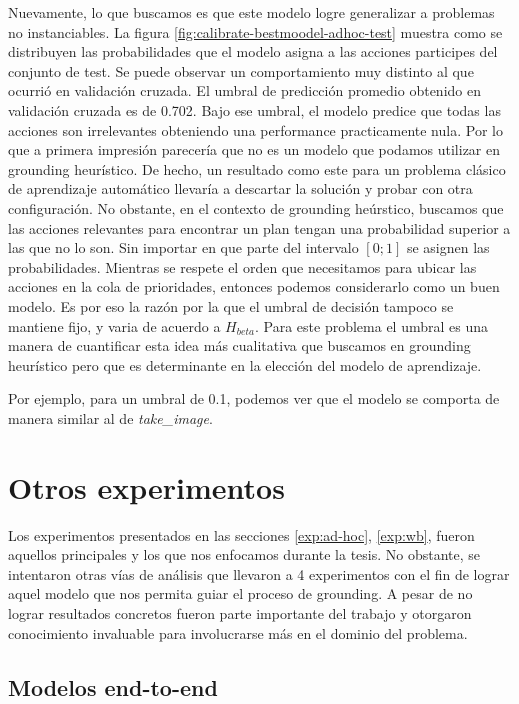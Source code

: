 Nuevamente, lo que buscamos es que este modelo logre generalizar a problemas no
instanciables. La figura \ref{fig:calibrate-bestmoodel-adhoc-test} muestra como
se distribuyen las probabilidades que el modelo asigna a las acciones participes
del conjunto de test. Se puede observar un comportamiento muy distinto al que
ocurrió en validación cruzada. El umbral de predicción promedio obtenido en
validación cruzada es de 0.702. Bajo ese umbral, el modelo predice que todas las
acciones son irrelevantes obteniendo una performance practicamente nula. Por lo
que a primera impresión parecería que no es un modelo que podamos utilizar en
grounding heurístico. De hecho, un resultado como este para un problema clásico
de aprendizaje automático llevaría a descartar la solución y probar con otra
configuración. No obstante, en el contexto de grounding heúrstico, buscamos que
las acciones relevantes para encontrar un plan tengan una probabilidad superior
a las que no lo son. Sin importar en que parte del intervalo $[0;1]$ se asignen
las probabilidades. Mientras se respete el orden que necesitamos para ubicar las
acciones en la cola de prioridades, entonces podemos considerarlo como un buen
modelo. Es por eso la razón por la que el umbral de decisión tampoco se mantiene
fijo, y varia de acuerdo a $H_{beta}$. Para este problema el umbral es una
manera de cuantificar esta idea más cualitativa que buscamos en grounding
heurístico pero que es determinante en la elección del modelo de aprendizaje.

Por ejemplo, para un umbral de 0.1, podemos ver que el modelo se comporta de
manera similar al de \emph{take\_image}.

\section{Otros experimentos}

Los experimentos presentados en las secciones \ref{exp:ad-hoc}, \ref{exp:wb},
fueron aquellos principales y los que nos enfocamos durante la tesis. No
obstante, se intentaron otras vías de análisis que llevaron a 4 experimentos con
el fin de lograr aquel modelo que nos permita guiar el proceso de grounding. A
pesar de no lograr resultados concretos fueron parte importante del trabajo y
otorgaron conocimiento invaluable para involucrarse más en el dominio del
problema.

\subsection{Modelos end-to-end}

